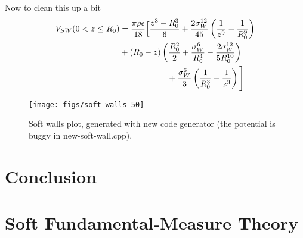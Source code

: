 \documentclass[letterpaper,twocolumn,amsmath,amssymb,prb]{revtex4-1}
\begin{document}
Now to clean this up a bit
\begin{align}
V_{SW}(0 < z \leq R_0) &= \frac{\pi\rho\epsilon}{18}\Big[ \frac{z^3-R_0^3}{6} +
  \frac{2\sigma_W^{12}}{45} \left(\frac{1}{z^9}-\frac{1}{R_0^9}\right)
  \notag \\
  &+ \left( R_0 - z \right)\left(\frac{R_0^2}{2} +
  \frac{\sigma_W^6}{R_0^4} - \frac{2\sigma_W^{12}}{5R_0^{10}}\right)
  \notag \\
  &\hspace{2cm}+\frac{\sigma_W^6}{3}\left(\frac{1}{R_0^3}-\frac{1}{z^3}
  \right) \Bigg]
\end{align}

\begin{figure}
  \texttt{[image: figs/soft-walls-50]}
  \caption{Soft walls plot, generated with new code generator (the
    potential is buggy in new-soft-wall.cpp).}
\end{figure}

\section{Conclusion}

\appendix

\section{Soft Fundamental-Measure Theory}
\end{document}
